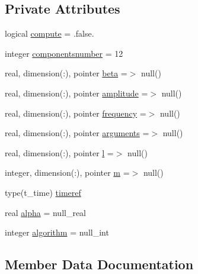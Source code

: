 \subsection*{Private Attributes}
\begin{DoxyCompactItemize}
\item 
logical \mbox{\hyperlink{structmodulehydrodynamic_1_1t__astro_aeb244543ebac1003c4e9048156213fd8}{compute}} = .false.
\item 
integer \mbox{\hyperlink{structmodulehydrodynamic_1_1t__astro_a4412fea7a15a3a3e939f34dca337230d}{componentsnumber}} = 12
\item 
real, dimension(\+:), pointer \mbox{\hyperlink{structmodulehydrodynamic_1_1t__astro_ab19050a77467d6809c88d041f0c4feec}{beta}} =$>$ null()
\item 
real, dimension(\+:), pointer \mbox{\hyperlink{structmodulehydrodynamic_1_1t__astro_a5dddd7109e3beaca5249c67a47f06fdd}{amplitude}} =$>$ null()
\item 
real, dimension(\+:), pointer \mbox{\hyperlink{structmodulehydrodynamic_1_1t__astro_a8ebba5e475c9b53e57e4e4b3501e9ec5}{frequency}} =$>$ null()
\item 
real, dimension(\+:), pointer \mbox{\hyperlink{structmodulehydrodynamic_1_1t__astro_a86367a5cd8436c6e5df8266d52aaa722}{arguments}} =$>$ null()
\item 
real, dimension(\+:), pointer \mbox{\hyperlink{structmodulehydrodynamic_1_1t__astro_a53a2d4ac67625ffa305e5e2ef595cb4e}{l}} =$>$ null()
\item 
integer, dimension(\+:), pointer \mbox{\hyperlink{structmodulehydrodynamic_1_1t__astro_a9ff91e43bc997a334e20b6d86532092c}{m}} =$>$ null()
\item 
type(t\+\_\+time) \mbox{\hyperlink{structmodulehydrodynamic_1_1t__astro_adc249c77a98e8ad68cfc122740245af3}{timeref}}
\item 
real \mbox{\hyperlink{structmodulehydrodynamic_1_1t__astro_a477ac23422f96b39c380fdfa6e48612a}{alpha}} = null\+\_\+real
\item 
integer \mbox{\hyperlink{structmodulehydrodynamic_1_1t__astro_aa4943f7518e8226e884ef346a69ebbaa}{algorithm}} = null\+\_\+int
\end{DoxyCompactItemize}


\subsection{Member Data Documentation}
\mbox{\label{structmodulehydrodynamic_1_1t__astro_aa4943f7518e8226e884ef346a69ebbaa}} 
